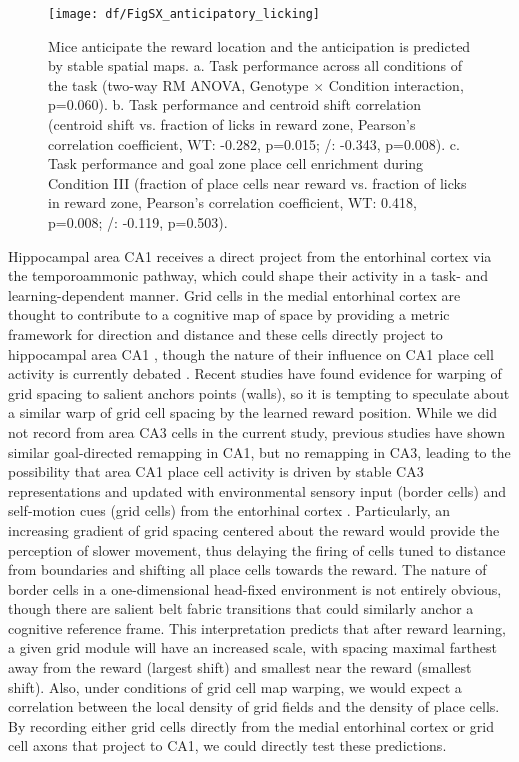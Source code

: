 \begin{figure}
	\centering
	\texttt{[image: df/FigSX\_anticipatory\_licking]}
	\caption[Mice anticipate the reward location and the anticipation is predicted by stable spatial maps]{Mice anticipate the reward location and the anticipation is predicted by stable spatial maps. a. Task performance across all conditions of the task (two-way RM ANOVA, Genotype $\times$ Condition interaction, p=0.060).
	b. Task performance and centroid shift correlation (centroid shift vs. fraction of licks in reward zone, Pearson's correlation coefficient, WT: -0.282, p=0.015; \df/: -0.343, p=0.008).
	c. Task performance and goal zone place cell enrichment during Condition III (fraction of place cells near reward vs. fraction of licks in reward zone, Pearson's correlation coefficient, WT: 0.418, p=0.008; \df/: -0.119, p=0.503).}
	\label{fig:conclusions:anticipatory_licking}
\end{figure}
Hippocampal area CA1 receives a direct project from the entorhinal cortex via the temporoammonic pathway, which could shape their activity in a task- and learning-dependent manner. Grid cells in the medial entorhinal cortex are thought to contribute to a cognitive map of space by providing a metric framework for direction and distance \citep{Hafting2005, Jeffery2015a} and these cells directly project to hippocampal area CA1 \citep{Zhang2013}, though the nature of their influence on CA1 place cell activity is currently debated \citep{Wills2010, Langston2010, Koenig2011, Brandon2011a}. Recent studies \citep{Krupic2015a, Stensola2015a} have found evidence for warping of grid spacing to salient anchors points (walls), so it is tempting to speculate about a similar warp of grid cell spacing by the learned reward position.
While we did not record from area CA3 cells in the current study, previous studies \citep{Dupret2010a} have shown similar goal-directed remapping in CA1, but no remapping in CA3, leading to the possibility that area CA1 place cell activity is driven by stable CA3 representations and updated with environmental sensory input (border cells) and self-motion cues (grid cells) from the entorhinal cortex \citep{Bush2014a}.
Particularly, an increasing gradient of grid spacing centered about the reward would provide the perception of slower movement, thus delaying the firing of cells tuned to distance from boundaries and shifting all place cells towards the reward. The nature of border cells in a one-dimensional head-fixed environment is not entirely obvious, though there are salient belt fabric transitions that could similarly anchor a cognitive reference frame.
This interpretation predicts that after reward learning, a given grid module will have an increased scale, with spacing maximal farthest away from the reward (largest shift) and smallest near the reward (smallest shift).
Also, under conditions of grid cell map warping, we would expect a correlation between the local density of grid fields and the density of place cells.
By recording either grid cells directly from the medial entorhinal cortex or grid cell axons that project to CA1, we could directly test these predictions.

